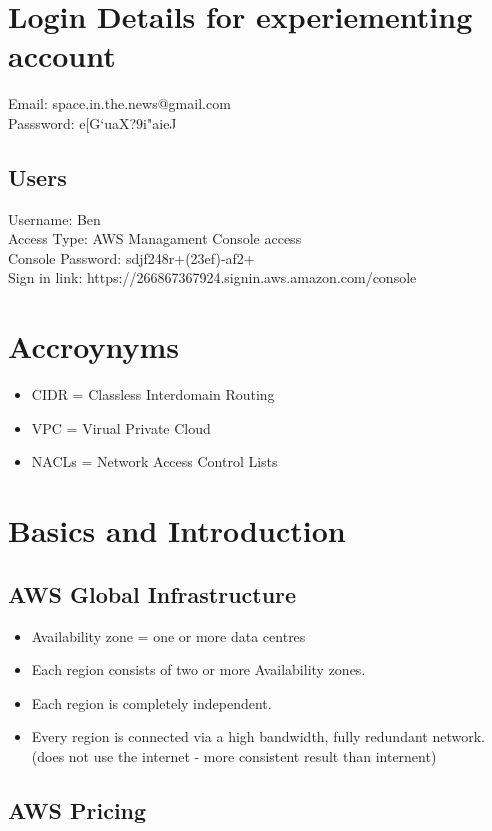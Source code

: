 \documentclass[11pt]{article}
\begin{document}
    \section*{Login Details for experiementing account}
    Email: space.in.the.news@gmail.com
    \\
    Passsword: e[G`uaX?9i"aieJ

    \subsection{Users}
    Username: Ben
    \\
    Access Type: AWS Managament Console access
    \\
    Console Password: sdjf248r+(23ef)-af2+
    \\
    Sign in link: https://266867367924.signin.aws.amazon.com/console

    \section{Accroynyms}
    \begin{itemize}
        \item CIDR = Classless Interdomain Routing
        \item VPC = Virual Private Cloud
        \item NACLs = Network Access Control Lists
    \end{itemize}

    \section{Basics and Introduction}
    \subsection{AWS Global Infrastructure}
    \begin{itemize}
        \item Availability zone = one or more data centres
        \item Each region consists of two or more Availability zones.
        \item Each region is completely independent.
        \item Every region is connected via a high bandwidth, fully redundant network. (does not use the internet - more consistent result than internent)
    \end{itemize}

    \subsection{AWS Pricing}
\end{document}
